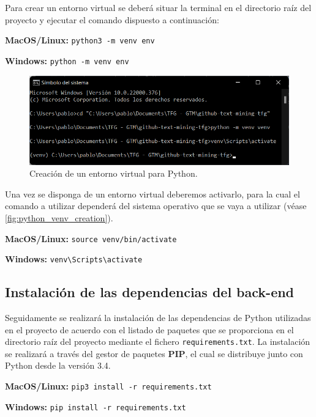 Para crear un entorno virtual se deberá situar la terminal en el directorio raíz del proyecto y ejecutar el comando dispuesto a continuación:

\vspace{0.5cm}
\centerline{\textbf{MacOS/Linux:} \texttt{python3 -m venv env}}
\centerline{\textbf{Windows:} \texttt{python -m venv env}}
\vspace{0.4cm}

\begin{figure}[!ht]
	\centering
    \includegraphics[width=\textwidth]{img/creating_venv.png}
	\caption{Creación de un entorno virtual para Python.}
	\label{fig:python_venv_creation}
\end{figure}

Una vez se disponga de un entorno virtual deberemos activarlo, para la cual el comando a utilizar dependerá del sistema operativo que se vaya a utilizar (véase \autoref{fig:python_venv_creation}).

\vspace{0.5cm}
\centerline{\textbf{MacOS/Linux:} \texttt{source venv/bin/activate}}
\centerline{\textbf{Windows:} \texttt{venv\textbackslash Scripts\textbackslash activate}}
\vspace{0.4cm}

\subsection{Instalación de las dependencias del back-end}
Seguidamente se realizará la instalación de las dependencias de Python utilizadas en el proyecto de acuerdo con el listado de paquetes que se proporciona en el directorio raíz del proyecto mediante el fichero \texttt{requirements.txt}. La instalación se realizará a través del gestor de paquetes \textbf{PIP}, el cual se distribuye junto con Python desde la versión 3.4.

\vspace{0.5cm}
\centerline{\textbf{MacOS/Linux:} \texttt{pip3 install -r requirements.txt}}
\centerline{\textbf{Windows:} \texttt{pip install -r requirements.txt}}
\vspace{0.4cm}

